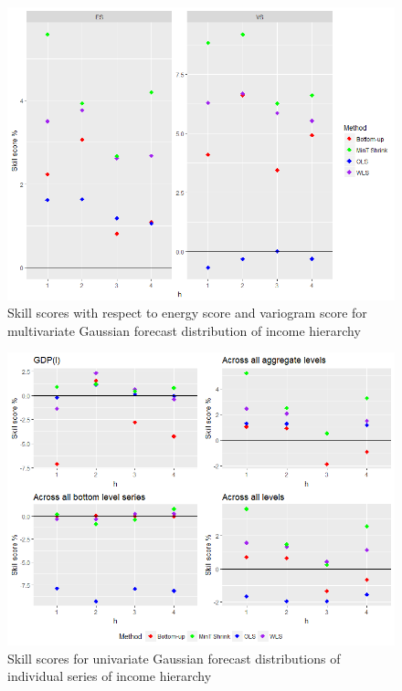 \documentclass[graybox]{svmult}
\begin{document}
\begin{figure}[H]
	\centering
	\small
	\includegraphics[scale=0.50]{Figs/Results/INC-ProbGaussF-MultivS_ES_VS.PNG}
	\caption{Skill scores with respect to energy score and variogram score for multivariate Gaussian forecast distribution of income hierarchy}\label{Inc_ProbGaus_ES_VS}
\end{figure}

\begin{figure}[H]
	\centering
	\small
	\includegraphics[scale=0.50]{Figs/Results/INC-ProbGaussF-UnivS_CRPS.PNG}
	\caption{Skill scores for univariate Gaussian forecast distributions of individual series of income hierarchy}\label{Inc_ProbGaus_UnivS}
\end{figure}
\end{document}
